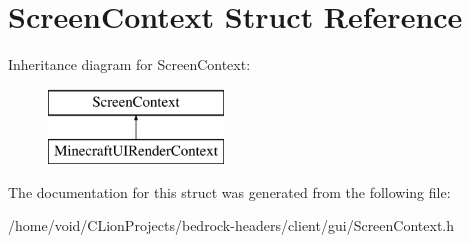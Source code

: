 \hypertarget{struct_screen_context}{}\section{Screen\+Context Struct Reference}
\label{struct_screen_context}
Inheritance diagram for Screen\+Context\+:\begin{figure}[H]
\begin{center}
\leavevmode
\includegraphics[height=2.000000cm]{struct_screen_context}
\end{center}
\end{figure}


The documentation for this struct was generated from the following file\+:\begin{DoxyCompactItemize}
\item 
/home/void/\+C\+Lion\+Projects/bedrock-\/headers/client/gui/Screen\+Context.\+h\end{DoxyCompactItemize}
